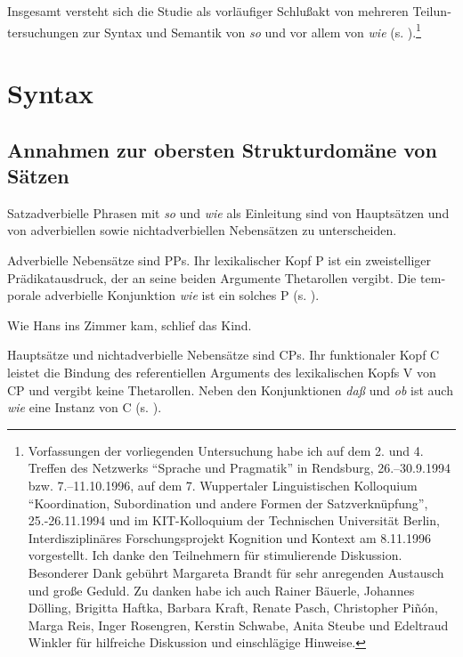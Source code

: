 \documentclass[output=paper, colorlinks, citecolor=brown, booklanguage=german]{langscibook}
\begin{document}
\begin{otherlanguage}{german}
Insgesamt versteht sich die Studie als vorläufiger Schlußakt von mehreren Teiluntersuchungen zur Syntax und Semantik von \textit{so} und vor allem von \textit{wie} (s. \citealt{zimmermann1987zursyntaxvonkomparationskonstruktionen, zimmermann1991diesubordinierendekonjunktionwie, zimmermann1992derskopusvonmodifikatoren, zimmermann1995bausteine}).\footnote{Vorfassungen der vorliegenden Untersuchung habe ich auf dem 2. und 4. Treffen des Netzwerks ``Sprache und Pragmatik'' in Rendsburg, 26.--30.9.1994 bzw. 7.--11.10.1996, auf dem 7. Wuppertaler Linguistischen Kolloquium ``Koordination, Subordination und andere Formen der Satzverknüpfung'', 25.-26.11.1994 und im KIT-Kolloquium der Technischen Universität Berlin, Interdisziplinäres Forschungsprojekt Kognition und Kontext am 8.11.1996 vorgestellt. Ich danke den Teilnehmern für stimulierende Diskussion. Besonderer Dank gebührt Margareta Brandt für sehr anregenden Austausch und große Geduld. Zu danken habe ich auch Rainer Bäuerle, Johannes Dölling, Brigitta Haftka, Barbara Kraft, Renate Pasch, Christopher Piñón, Marga Reis, Inger Rosengren, Kerstin Schwabe, Anita Steube und Edeltraud Winkler für hilfreiche Diskussion und einschlägige Hinweise.\label{ft:1}}

\section{Syntax}\label{sec:zi97:2}
\subsection{Annahmen zur obersten Strukturdomäne von Sätzen}\label{sec:zi97:2.1}

Satzadverbielle Phrasen mit \textit{so} und \textit{wie} als Einleitung sind von Hauptsätzen und von adverbiellen sowie nichtadverbiellen Nebensätzen zu unterscheiden.

Adverbielle Nebensätze sind PPs. Ihr lexikalischer Kopf P ist ein zweistelliger Prädikatausdruck, der an seine beiden Argumente Thetarollen vergibt. Die temporale adverbielle Konjunktion \textit{wie} ist ein solches P (s. \citealt{steube1980temporalebedeutungimdeutschen}).

\ea \label{ex:zi97:13} Wie Hans ins Zimmer kam, schlief das Kind.
\z

\noindent Hauptsätze und nichtadverbielle Nebensätze sind CPs. Ihr funktionaler Kopf C leistet die Bindung des referentiellen Arguments des lexikalischen Kopfs V von CP und vergibt keine Thetarollen. Neben den Konjunktionen \textit{daß} und \textit{ob} ist auch \textit{wie} eine Instanz von C (s. \citealt{zimmermann1991diesubordinierendekonjunktionwie}).


\end{otherlanguage}
\end{document}
